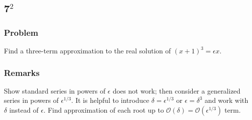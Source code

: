 \documentclass[12pt]{article}
\begin{document}
\newpage
\subsection{7$^2$}
\subsubsection*{Problem}
Find a three-term approximation to the real solution of ${(x+1)}^3=\epsilon x$.

\subsubsection*{Remarks}
Show standard series in powers of $\epsilon$ does not work; then consider a
generalized series in powers of $\epsilon^{1/3}$. It is helpful to introduce
$\delta=\epsilon^{1/3}$ or $\epsilon=\delta^3$ and work with $\delta$ instead of
$\epsilon$. Find approximation of each root up to
$\mathcal{O}(\delta)=\mathcal{O}(\epsilon^{1/3})$ term.
\end{document}
